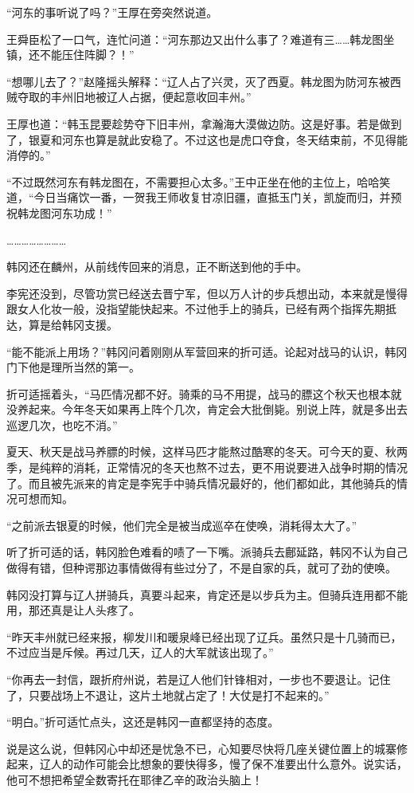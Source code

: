 “河东的事听说了吗？”王厚在旁突然说道。

王舜臣松了一口气，连忙问道：“河东那边又出什么事了？难道有三……韩龙图坐镇，还不能压住阵脚？！”

“想哪儿去了？”赵隆摇头解释：“辽人占了兴灵，灭了西夏。韩龙图为防河东被西贼夺取的丰州旧地被辽人占据，便起意收回丰州。”

王厚也道：“韩玉昆要趁势夺下旧丰州，拿瀚海大漠做边防。这是好事。若是做到了，银夏和河东也算是就此安稳了。不过这也是虎口夺食，冬天结束前，不见得能消停的。”

“不过既然河东有韩龙图在，不需要担心太多。”王中正坐在他的主位上，哈哈笑道，“今日当痛饮一番，一贺我王师收复甘凉旧疆，直抵玉门关，凯旋而归，并预祝韩龙图河东功成！”

……………………

韩冈还在麟州，从前线传回来的消息，正不断送到他的手中。

李宪还没到，尽管功赏已经送去晋宁军，但以万人计的步兵想出动，本来就是慢得跟女人化妆一般，没指望能快起来。不过他手上的骑兵，已经有两个指挥先期抵达，算是给韩冈支援。

“能不能派上用场？”韩冈问着刚刚从军营回来的折可适。论起对战马的认识，韩冈门下他是理所当然的第一。

折可适摇着头，“马匹情况都不好。骑乘的马不用提，战马的膘这个秋天也根本就没养起来。今年冬天如果再上阵个几次，肯定会大批倒毙。别说上阵，就是多出去巡逻几次，也吃不消。”

夏天、秋天是战马养膘的时候，这样马匹才能熬过酷寒的冬天。可今天的夏、秋两季，是纯粹的消耗，正常情况的冬天也熬不过去，更不用说要进入战争时期的情况了。而且被先派来的肯定是李宪手中骑兵情况最好的，他们都如此，其他骑兵的情况可想而知。

“之前派去银夏的时候，他们完全是被当成巡卒在使唤，消耗得太大了。”

听了折可适的话，韩冈脸色难看的啧了一下嘴。派骑兵去鄜延路，韩冈不认为自己做得有错，但种谔那边事情做得有些过分了，不是自家的兵，就可了劲的使唤。

韩冈没打算与辽人拼骑兵，真要斗起来，肯定还是以步兵为主。但骑兵连用都不能用，那还真是让人头疼了。

“昨天丰州就已经来报，柳发川和暖泉峰已经出现了辽兵。虽然只是十几骑而已，不过应当是斥候。再过几天，辽人的大军就该出现了。”

“你再去一封信，跟折府州说，若是辽人他们针锋相对，一步也不要退让。记住了，只要战场上不退让，这片土地就占定了！大仗是打不起来的。”

“明白。”折可适忙点头，这还是韩冈一直都坚持的态度。

说是这么说，但韩冈心中却还是忧急不已，心知要尽快将几座关键位置上的城寨修起来，辽人的动作可能会比想象的要快得多，慢了保不准要出什么意外。说实话，他可不想把希望全数寄托在耶律乙辛的政治头脑上！


